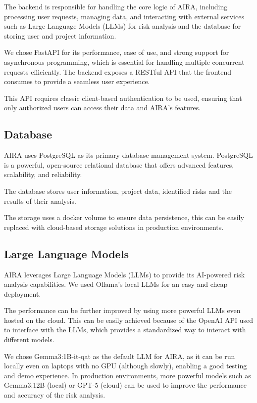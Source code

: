 The backend is responsible for handling the core logic
of AIRA, including processing user requests, managing
data, and interacting with external services such as
Large Language Models (LLMs) for risk analysis and
the database for storing user and project information.

We chose FastAPI for its performance, ease of use,
and strong support for asynchronous programming, which
is essential for handling multiple concurrent requests
efficiently.
The backend exposes a RESTful API that the frontend
consumes to provide a seamless user experience.

This API requires classic client-based authentication
to be used, ensuring that only authorized users can
access their data and AIRA's features.

\subsection{Database}
AIRA uses PostgreSQL as its primary database management
system. PostgreSQL is a powerful, open-source relational
database that offers advanced features, scalability,
and reliability.

The database stores user information, project data,
identified risks and the results of their analysis.

The storage uses a docker volume to ensure data persistence,
this can be easily replaced with cloud-based storage solutions
in production environments.

\subsection{Large Language Models}
AIRA leverages Large Language Models (LLMs) to provide
its AI-powered risk analysis capabilities. We used
Ollama's local LLMs for an easy and cheap deployment.

The performance can be further improved by using
more powerful LLMs even hosted on the cloud.
This can be easily achieved because of the OpenAI API
used to interface with the LLMs, which provides a
standardized way to interact with different models.

We chose Gemma3:1B-it-qat as the default LLM for AIRA,
as it can be run locally even on laptops with no GPU
(although slowly), enabling a good testing and demo experience.
In production environments, more powerful models such as
Gemma3:12B (local) or GPT-5 (cloud) can be used to
improve the performance and accuracy of the risk analysis.

